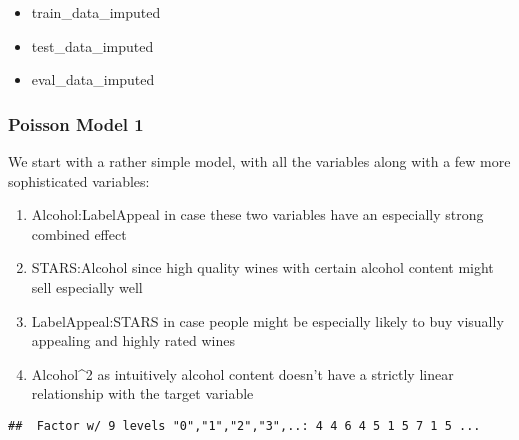 \documentclass[
]{article}
\providecommand{\tightlist}{%
  \setlength{\itemsep}{0pt}\setlength{\parskip}{0pt}}
\begin{document}
\begin{itemize}
\tightlist
\item
  train\_data\_imputed
\item
  test\_data\_imputed
\item
  eval\_data\_imputed
\end{itemize}

\subsubsection{Poisson Model 1}\label{poisson-model-1}

We start with a rather simple model, with all the variables along with a
few more sophisticated variables:

\begin{enumerate}
\def\labelenumi{\arabic{enumi}.}
\tightlist
\item
  Alcohol:LabelAppeal in case these two variables have an especially
  strong combined effect
\item
  STARS:Alcohol since high quality wines with certain alcohol content
  might sell especially well
\item
  LabelAppeal:STARS in case people might be especially likely to buy
  visually appealing and highly rated wines
\item
  Alcohol\^{}2 as intuitively alcohol content doesn't have a strictly
  linear relationship with the target variable
\end{enumerate}

\begin{verbatim}
##  Factor w/ 9 levels "0","1","2","3",..: 4 4 6 4 5 1 5 7 1 5 ...
\end{verbatim}
\end{document}
